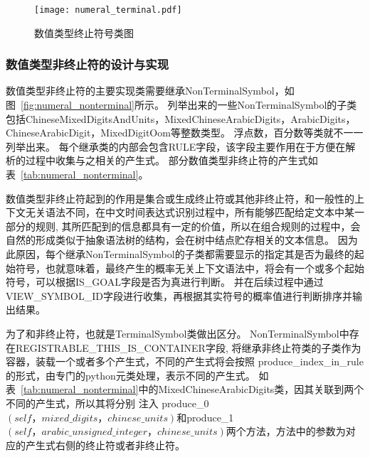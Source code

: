 \begin{figure}[h]
    \centering
    \texttt{[image: numeral\_terminal.pdf]}
    \caption{数值类型终止符号类图}
    \label{fig:numeral_terminal}
\end{figure}


\subsubsection{数值类型非终止符的设计与实现}

数值类型非终止符的主要实现类需要继承NonTerminalSymbol，如图~\ref{fig:numeral_nonterminal}所示。
列举出来的一些NonTerminalSymbol的子类包括ChineseMixedDigitsAndUnits，MixedChineseArabicDigits，ArabicDigits，ChineseArabicDigit，MixedDigitOom等整数类型。
浮点数，百分数等类就不一一列举出来。 每个继承类的内部会包含RULE字段，该字段主要作用在于方便在解析的过程中收集与之相关的产生式。 部分数值类型非终止符的产生式如表~\ref{tab:numeral_nonterminal}。

数值类型非终止符起到的作用是集合或生成终止符或其他非终止符，和一般性的上下文无关语法不同，在中文时间表达式识别过程中，所有能够匹配给定文本中某一部分的规则,
其所匹配到的信息都具有一定的价值，所以在组合规则的过程中，会自然的形成类似于抽象语法树的结构，会在树中结点贮存相关的文本信息。
因为此原因，每个继承NonTerminalSymbol的子类都需要显示的指定其是否为最终的起始符号，也就意味着，最终产生的概率无关上下文语法中，将会有一个或多个起始符号，可以根据IS\_GOAL字段是否为真进行判断。
并在后续过程中通过VIEW\_SYMBOL\_ID字段进行收集，再根据其实符号的概率值进行判断排序并输出结果。

为了和非终止符，也就是TerminalSymbol类做出区分。
NonTerminalSymbol中存在REGISTRABLE\_THIS\_IS\_CONTAINER字段,
将继承非终止符类的子类作为容器，装载一个或者多个产生式，不同的产生式将会按照
produce\_index\_in\_rule的形式，由专门的python元类处理，表示不同的产生式。 如表~\ref{tab:numeral_nonterminal}中的MixedChineseArabicDigits类，因其关联到两个不同的产生式，所以其将分别
注入 produce\_0$\left(self，mixed\_digits，chinese\_units\right)$和produce\_1$\left(self，arabic\_unsigned\_integer，chinese\_units\right)$两个方法，方法中的参数为对应的产生式右侧的终止符或者非终止符。


